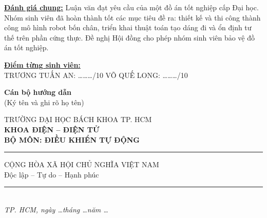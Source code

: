 \documentclass[12pt,a4paper]{article}
\begin{document}
\vspace{0.2cm}

\noindent \underline{\textbf{Đánh giá chung:}} Luận văn đạt yêu cầu của một đồ án tốt nghiệp cấp Đại học. Nhóm sinh viên đã hoàn thành tốt các mục tiêu đề ra: thiết kế và thi công thành công mô hình robot bốn chân, triển khai thuật toán tạo dáng đi và ổn định tư thế trên phần cứng thực. Đề nghị Hội đồng cho phép nhóm sinh viên bảo vệ đồ án tốt nghiệp.

\vspace{0.3cm}

\noindent \underline{\textbf{Điểm từng sinh viên:}} \\[0.1cm]
\small TRƯƠNG TUẤN AN: \dots\dots\dots/10 \hfill VÕ QUẾ LONG: \dots\dots\dots/10 \hspace{2cm}

\vspace{0.3cm}

\hfill
\begin{minipage}[t]{0.45\textwidth}
    \centering
    \textbf{Cán bộ hướng dẫn} \\
    \vspace{0.1cm}
    (Ký tên và ghi rõ họ tên)
\end{minipage}

\newpage

\noindent
\begin{minipage}[t]{0.48\textwidth}
    \centering
    {\small TRƯỜNG ĐẠI HỌC BÁCH KHOA TP. HCM} \\
    \textbf{KHOA ĐIỆN -- ĐIỆN TỬ} \\
    \textbf{BỘ MÔN: ĐIỀU KHIỂN TỰ ĐỘNG} \\
    \vspace{0.1cm}
    \rule{3.5cm}{0.5pt}
\end{minipage}
\hfill
\begin{minipage}[t]{0.48\textwidth}
    \centering
    {\small CỘNG HÒA XÃ HỘI CHỦ NGHĨA VIỆT NAM} \\
    {\small Độc lập -- Tự do -- Hạnh phúc} \\
    \vspace{0.1cm}
    \rule{4cm}{0.5pt} \\
    \vspace{0.2cm}
    \textit{\small TP. HCM, ngày \dots tháng \dots năm \dots}
\end{minipage}

\vspace{0.5cm}
\end{document}
